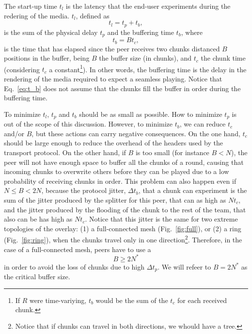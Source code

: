 

\label{sec:latency}


The start-up time $t_l$ is the latency that the end-user experiments
during the redering of the media. $t_l$, defined as
\begin{equation}
  \label{eq:t_l}
  t_l = t_p + t_b,
\end{equation}
is the sum of the physical
delay $t_p$ and the buffering time $t_b$, where
\begin{equation}
  \label{eq:t_b}
  t_b = Bt_c,
\end{equation}
is the time that has elapsed since the peer receives two chunks
distanced $B$ positions in the buffer, being $B$ the buffer size (in
chunks), and $t_c$ the chunk time (considering $t_c$ a
constant\footnote{If $R$ were time-variying, $t_b$ would be the sum of
  the $t_c$ for each received chunk.}). In other words, the buffering
time is the delay in the rendering of the media required to expect a
seamless playing. Notice that Eq.~\ref{eq:t_b} does not assume that
the chunks fill the buffer in order during the buffering time.

To minimize $t_l$, $t_p$ and $t_b$ should be as small as possible. How
to minimize $t_p$ is out of the scope of this discussion. However, to
minimize $t_b$, we can reduce $t_c$ and/or $B$, but these actions can
carry negative consequences. On the one hand, $t_c$ should be large
enough to reduce the overhead of the headers used by the transport
protocol. On the other hand, if $B$ is too small (for instance $B<N$),
the peer will not have enough space to buffer all the chunks of a
round, causing that incoming chunks to overwrite others before they
can be played due to a low probability of receiving chunks in
order. This problem can also happen even if $N\leq B<2N$, because the
protocol jitter, $\Delta t_b$, that a chunk can experiment is the sum
of the jitter produced by the splitter for this peer, that can as high
as $Nt_c$, and the jitter produced by the flooding of the chunk to the
rest of the team, that also can be has high as $Nt_c$. Notice that
this jitter is the same for two extreme topologies of the overlay: (1)
a full-connected mesh (Fig.~\ref{fig:full}), or (2) a ring
(Fig.~\ref{fig:ring}), when the chunks travel only in one
direction\footnote{Notice that if chunks can travel in both
  directions, we whould have a tree.}. Therefore, in the case of a full-connected mesh, peers have to use a
\begin{equation}
  \label{eq:minimum_B}
  B\ge 2N^*
\end{equation}
in order to avoid the loss of chunks due to high $\Delta t_p$. We will
refeer to $B=2N^*$ as the critical buffer size.

